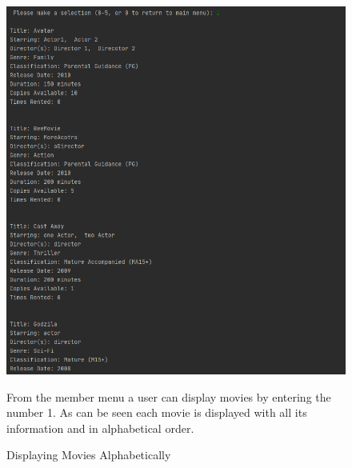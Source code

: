 \documentclass[a4paper,12pt]{article}
\begin{document}
\begin{figure}[!htb]
\centering
\includegraphics[width=1\textwidth]{7}
\caption{Displaying Movies Alphabetically}
\medskip
\small
From the member menu a user can display movies by entering the number 1. As can be seen each movie is displayed with all its information and in alphabetical order.
\end{figure}
\end{document}
